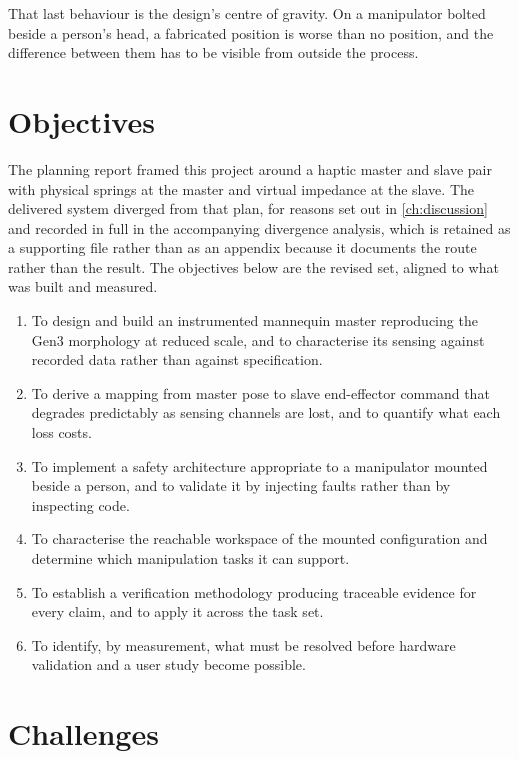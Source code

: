 That last behaviour is the design's centre of gravity. On a manipulator bolted
beside a person's head, a fabricated position is worse than no position, and
the difference between them has to be visible from outside the process.

\section{Objectives}

The planning report framed this project around a haptic master and slave pair
with physical springs at the master and virtual impedance at the slave. The
delivered system diverged from that plan, for reasons set out in
\cref{ch:discussion} and recorded in full in the accompanying divergence
analysis, which is retained as a supporting file rather than as an appendix
because it documents the route rather than the result. The objectives below
are the revised
set, aligned to what was built and measured.

\begin{enumerate}
  \item To design and build an instrumented mannequin master reproducing the
    Gen3 morphology at reduced scale, and to characterise its sensing against
    recorded data rather than against specification.
  \item To derive a mapping from master pose to slave end-effector command
    that degrades predictably as sensing channels are lost, and to quantify
    what each loss costs.
  \item To implement a safety architecture appropriate to a manipulator
    mounted beside a person, and to validate it by injecting faults rather
    than by inspecting code.
  \item To characterise the reachable workspace of the mounted configuration
    and determine which manipulation tasks it can support.
  \item To establish a verification methodology producing traceable evidence
    for every claim, and to apply it across the task set.
  \item To identify, by measurement, what must be resolved before hardware
    validation and a user study become possible.
\end{enumerate}

\section{Challenges}

